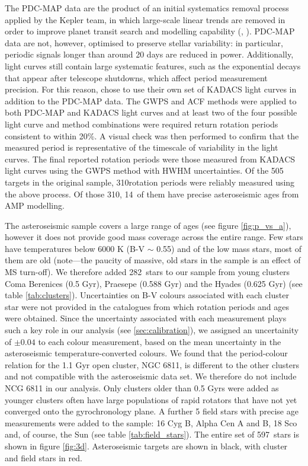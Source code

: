\documentclass[10pt,preprint]{aastex}
\newcommand{\nastero}{310}
\newcommand{\nprecise}{14~}
\newcommand{\ncluster}{282~}
\newcommand{\ntotal}{597~}
\begin{document}
The PDC-MAP data are the product of an initial systematics removal process applied by the Kepler team, in which large-scale linear trends are removed in order to improve planet transit search and modelling capability (\citet{Smith_2012}, \citet{Stumpe_2012}).
PDC-MAP data are not, however, optimised to preserve stellar variability: in particular, periodic signals longer than around 20 days are reduced in power.
Additionally, light curves still contain large systematic features, such as the exponential decays that appear after telescope shutdowns, which affect period measurement precision.
For this reason, \citet{Garcia2014} chose to use their own set of KADACS light curves in addition to the PDC-MAP data.
The GWPS and ACF methods were applied to both PDC-MAP and KADACS light curves and at least two of the four possible light curve and method combinations were required return rotation periods consistent to within 20\%.
A visual check was then performed to confirm that the measured period is representative of the timescale of variability in the light curves.
The final reported rotation periods were those measured from KADACS light curves using the GWPS method with HWHM uncertainties.
Of the 505 targets in the original sample, \nastero rotation periods were reliably measured using the above process.
Of those \nastero, \nprecise of them have precise asteroseismic ages from AMP modelling.

The asteroseismic sample covers a large range of ages (see figure \ref{fig:p_vs_a}), however it does not provide good mass coverage across the entire range.
Few stars have temperatures below 6000 K (B-V $\sim$ 0.55) and of the low mass stars, most of them are old (note---the paucity of massive, old stars in the sample is an effect of MS turn-off).
We therefore added \ncluster stars to our sample from young clusters Coma Berenices (0.5 Gyr), Praesepe (0.588 Gyr) and the Hyades (0.625 Gyr) (see table \ref{tab:clusters}).
Uncertainties on B-V colours associated with each cluster star were not provided in the catalogues from which rotation periods and ages were obtained.
Since the uncertainty associated with each measurement plays such a key role in our analysis (see \textsection \ref{sec:calibration}), we assigned an uncertainity of $\pm 0.04$ to each colour measurement, based on the mean uncertainty in the asteroseismic temperature-converted colours.
We found that the period-colour relation for the 1.1 Gyr open cluster, NGC 6811, is different to the other clusters and not compatible with the asteroseismic data set.
We therefore do not include NCG 6811 in our analysis.
Only clusters older than 0.5 Gyrs were added as younger clusters often have large populations of rapid rotators that have not yet converged onto the gyrochronology plane.
A further 5 field stars with precise age measurements were added to the sample: 16 Cyg B, Alpha Cen A and B, 18 Sco and, of course, the Sun (see table \ref{tab:field_stars}).
The entire set of \ntotal stars is shown in figure \ref{fig:3d}. Asteroseismic targets are shown in black, with cluster and field stars in red.
\end{document}
